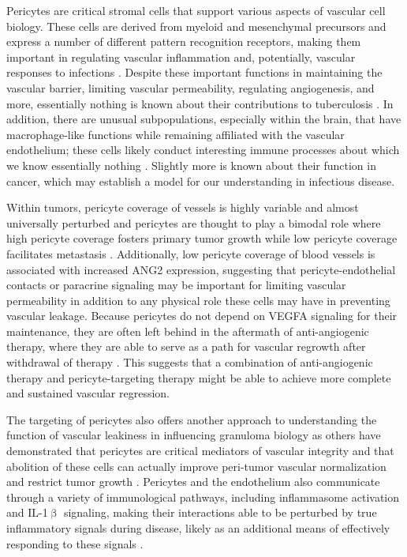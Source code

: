 Pericytes are critical stromal cells that support various aspects of vascular cell biology. These cells are derived from myeloid and mesenchymal precursors and express a number of different pattern recognition receptors, making them important in regulating vascular inflammation and, potentially, vascular responses to infections \citep{Stark2013, Yamazaki2018}. Despite these important functions in maintaining the vascular barrier, limiting vascular permeability, regulating angiogenesis, and more, essentially nothing is known about their contributions to tuberculosis \citep{Bergers2005}. In addition, there are unusual subpopulations, especially within the brain, that have macrophage\hyp{}like functions while remaining affiliated with the vascular endothelium; these cells likely conduct interesting immune processes about which we know essentially nothing \citep{Balabanov1996, VeneroGalanternik2017}. Slightly more is known about their function in cancer, which may establish a model for our understanding in infectious disease.

Within tumors, pericyte coverage of vessels is highly variable and almost universally perturbed and pericytes are thought to play a bimodal role where high pericyte coverage fosters primary tumor growth while low pericyte coverage facilitates metastasis \citep{Ribeiro2015, Saharinen2017}. Additionally, low pericyte coverage of blood vessels is associated with increased ANG2 expression, suggesting that pericyte\hyp{}endothelial contacts or paracrine signaling may be important for limiting vascular permeability in addition to any physical role these cells may have in preventing vascular leakage. Because pericytes do not depend on VEGFA signaling for their maintenance, they are often left behind in the aftermath of anti\hyp{}angiogenic therapy, where they are able to serve as a path for vascular regrowth after withdrawal of therapy \citep{Keskin2015, Ribeiro2015}. This suggests that a combination of anti\hyp{}angiogenic therapy and pericyte\hyp{}targeting therapy might be able to achieve more complete and sustained vascular regression. 

The targeting of pericytes also offers another approach to understanding the function of vascular leakiness in influencing granuloma biology as others have demonstrated that pericytes are critical mediators of vascular integrity and that abolition of these cells can actually improve peri\hyp{}tumor vascular normalization and restrict tumor growth \citep{Keskin2015}. Pericytes and the endothelium also communicate through a variety of immunological pathways, including inflammasome activation and IL\hyp{}1$\upbeta$ signaling, making their interactions able to be perturbed by true inflammatory signals during disease, likely as an additional means of effectively responding to these signals \citep{Kozma2021}.

